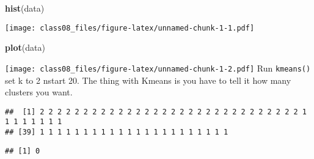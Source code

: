 \documentclass[
]{article}
\newenvironment{Shaded}{\begin{snugshade}}{\end{snugshade}}
\newcommand{\CommentTok}[1]{\textcolor[rgb]{0.56,0.35,0.01}{\textit{#1}}}
\newcommand{\DataTypeTok}[1]{\textcolor[rgb]{0.13,0.29,0.53}{#1}}
\newcommand{\DecValTok}[1]{\textcolor[rgb]{0.00,0.00,0.81}{#1}}
\newcommand{\KeywordTok}[1]{\textcolor[rgb]{0.13,0.29,0.53}{\textbf{#1}}}
\newcommand{\NormalTok}[1]{#1}
\newcommand{\OperatorTok}[1]{\textcolor[rgb]{0.81,0.36,0.00}{\textbf{#1}}}
\newcommand{\StringTok}[1]{\textcolor[rgb]{0.31,0.60,0.02}{#1}}
\begin{document}
\begin{Shaded}
\begin{Highlighting}[]
\KeywordTok{hist}\NormalTok{(data)}
\end{Highlighting}
\end{Shaded}

\texttt{[image: class08\_files/figure-latex/unnamed-chunk-1-1.pdf]}

\begin{Shaded}
\begin{Highlighting}[]
\KeywordTok{plot}\NormalTok{(data)}
\end{Highlighting}
\end{Shaded}

\texttt{[image: class08\_files/figure-latex/unnamed-chunk-1-2.pdf]} Run
\texttt{kmeans()} set k to 2 nstart 20. The thing with Kmeans is you
have to tell it how many clusters you want.

\begin{Shaded}
\end{Shaded}

\begin{verbatim}
##  [1] 2 2 2 2 2 2 2 2 2 2 2 2 2 2 2 2 2 2 2 2 2 2 2 2 2 2 2 2 2 2 1 1 1 1 1 1 1 1
## [39] 1 1 1 1 1 1 1 1 1 1 1 1 1 1 1 1 1 1 1 1 1 1
\end{verbatim}

\begin{Shaded}
\end{Shaded}

\begin{verbatim}
## [1] 0
\end{verbatim}

\begin{Shaded}
\end{Shaded}
\end{document}
